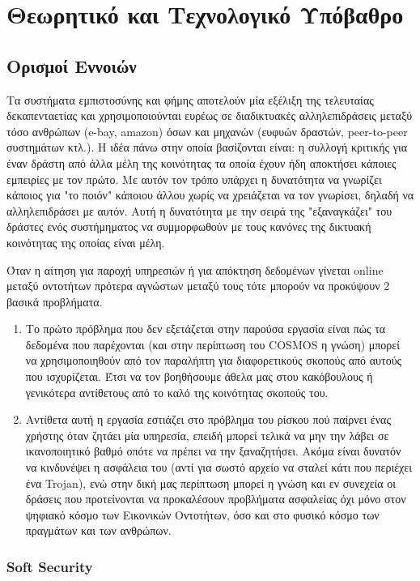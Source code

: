 \chapter{Θεωρητικό και Τεχνολογικό Υπόβαθρο}\label{ch:bkg}
\section{Ορισμοί Εννοιών}

Τα συστήματα εμπιστοσύνης και φήμης αποτελούν μία εξέλιξη της τελευταίας δεκαπενταετίας και χρησιμοποιούνται ευρέως σε διαδικτυακές αλληλεπιδράσεις μεταξύ τόσο ανθρώπων (e-bay, amazon) όσων και μηχανών (ευφυών δραστών, peer-to-peer συστημάτων κτλ.). Η ιδέα πάνω στην οποία βασίζονται είναι: η συλλογή κριτικής για έναν δράστη από άλλα μέλη της κοινότητας τα οποία έχουν ήδη αποκτήσει κάποιες εμπειρίες με τον πρώτο. Με αυτόν τον τρόπο υπάρχει η δυνατότητα να γνωρίζει κάποιος για "το ποιόν"  κάποιου άλλου χωρίς να χρειάζεται να τον γνωρίσει, δηλαδή να αλληλεπιδράσει με αυτόν. Αυτή η δυνατότητα με την σειρά της "εξαναγκάζει" του δράστες ενός συστήμηματος να συμμορφωθούν με τους κανόνες της δικτυακή κοινότητας της οποίας είναι μέλη.

Όταν η αίτηση για παροχή υπηρεσιών ή για απόκτηση δεδομένων γίνεται online μεταξύ οντοτήτων πρότερα αγνώστων μεταξύ τους τότε μπορούν να προκύψουν 2 βασικά προβλήματα.
\begin{enumerate}
\item Το πρώτο πρόβλημα που δεν εξετάζεται στην παρούσα εργασία είναι πώς τα δεδομένα που παρέχονται (και στην περίπτωση του COSMOS η γνώση) μπορεί να χρησιμοποιηθούν από τον παραλήπτη για διαφορετικούς σκοπούς από αυτούς που ισχυρίζεται. Έτσι να τον βοηθήσουμε άθελα μας στου κακόβουλους ή γενικότερα αντίθετους από το καλό της κοινότητας σκοπούς του.

\item Αντίθετα αυτή η εργασία εστιάζει στο πρόβλημα του ρίσκου πού παίρνει ένας χρήστης όταν ζητάει μία υπηρεσία, επειδή μπορεί τελικά να μην την λάβει σε ικανοποιητικό βαθμό οπότε να πρέπει να την ξαναζητήσει. Ακόμα είναι δυνατόν να κινδυνέψει η ασφάλεια του (αντί για σωστό αρχείο να σταλεί κάτι που περιέχει ένα Trojan), ενώ στην δική μας περίπτωση μπορεί η γνώση και εν συνεχεία οι δράσεις που προτείνονται να προκαλέσουν προβλήματα ασφαλείας όχι μόνο στον ψηφιακό κόσμο  των Εικονικών Οντοτήτων, όσο και στο φυσικό κόσμο των πραγμάτων και των ανθρώπων.
\end{enumerate}
\newpage
\subsection{Soft Security}


